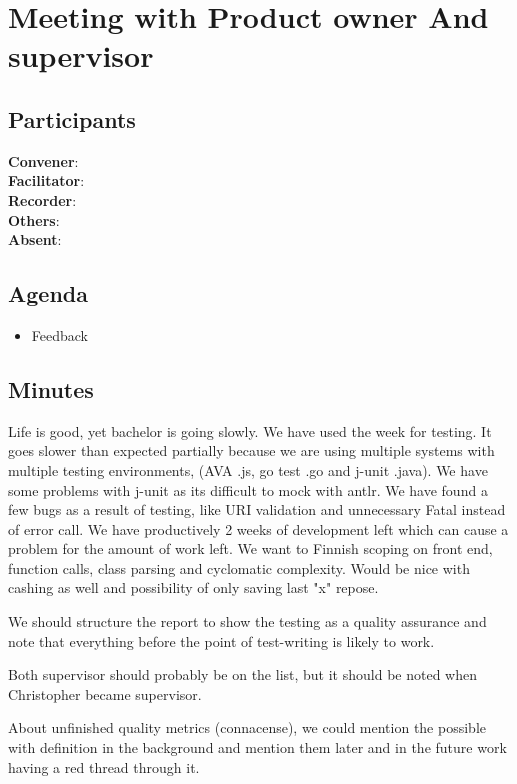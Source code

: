 \section*{Meeting with Product owner And supervisor}
\subsection*{Participants}
\textbf{Convener}: \productowner{}\\
\textbf{Facilitator}: \facilitator{}  \\
\textbf{Recorder}: \scrummaster{}  \\
\textbf{Others}: \groupleader{} \\
\textbf{Absent}: 

\subsection*{Agenda}
\begin{itemize}s
    \item Feedback
\end{itemize}

\subsection*{Minutes}
Life is good, yet bachelor is going slowly. We have used the week for testing. It goes slower than expected partially because we are using multiple systems with multiple testing environments, (AVA .js, go test .go and j-unit .java). We have some problems with j-unit as its difficult to mock with antlr. We have found a few bugs as a result of testing, like URI validation and unnecessary Fatal instead of error call. 
We have productively 2 weeks of development left which can cause a problem for the amount of work left. 
We want to Finnish scoping on front end, function calls, class parsing and cyclomatic complexity. Would be nice with cashing as well and  possibility of only saving last "x" repose.

We should structure the report to show the testing as a quality assurance and note that everything before the point of test-writing is likely to work.

Both supervisor should probably be on the list, but it should be noted when Christopher became supervisor.

About unfinished quality metrics (connacense), we could mention the possible with definition in the background and mention them later and in the future work having a red thread through it. 
\newpage